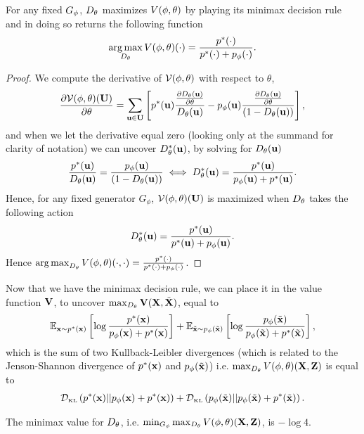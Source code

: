 \begin{theorem}
 \label{theorem:minimax}
 For any fixed $G_\phi$, $D_\theta$ maximizes $V(\phi, \theta)$ by playing its minimax
 decision rule and in doing so returns the following function
  \begin{align}
    \operatorname*{arg\,max}_{D_\theta}V(\phi, \theta)(\cdot) = {p^*(\mathbf{\cdot}) \over p^*(\mathbf{\cdot}) + p_{\phi}(\mathbf{\cdot})}.
  \end{align}
\end{theorem}

\begin{proof}
  We compute the derivative of $\mathcal{V}(\phi, \theta)$ with respect to $\theta$,
  \begin{align}
    \label{eq:derivatives}
    {\partial \Va(\*U) \over \partial \theta} = \sum_{\*u \in \*U}\left[ \ptu { {\partial \D(\*u) \over \partial \theta} \over \D(\*u)} -
    \pgu {{\partial \D(\*u) \over \partial \theta} \over (1 - \D(\*u))}\right],
  \end{align}
  and when we let the derivative equal zero (looking only at the summand for
  clarity of notation) we can uncover $D_\theta^*(\mathbf{u})$, by solving for $D_\theta(\mathbf{u})$
  \begin{align}
    \label{eq:20}
    {\ptu \over \D(\*u)} = {\pgu \over (1 - \D(\*u))} \iff \D^*(\*u) = {\ptu \over \pgu + \ptu}.
  \end{align}
  Hence, for any fixed generator $G_\phi$, $\mathcal{V}(\phi, \theta)(\mathbf{U})$ is maximized when $D_\theta$ takes
  the following action
  \begin{align}
    \label{eq:13}
    \D^*(\*u) = \Dstar{u}.
  \end{align}
  Hence $\operatorname*{arg\,max}_{D_\theta}V(\phi, \theta)(\cdot, \cdot) = {p^*(\mathbf{\cdot}) \over p^*(\mathbf{\cdot}) + p_{\phi}(\mathbf{\cdot})}$.
\end{proof}

Now that we have the minimax decision rule, we can place it in the
value function $\mathbf{V}$, to uncover $\max_{D_\theta}\mathbf{V}(\mathbf{X}, \tilde{\mathbf{X}})$,
equal to
\begin{align}
  \label{eq:sum-of-two-kl-divergences}
   \mathbb{E}_{\*x \sim \pt}\left[\log{{\pt \over p_{\phi}(\*x)+ \pt}}\right] + \mathbb{E}_{\tilde{\*x} \sim \pg}\left[\log{\pg \over \pg + p^*(\tilde{\*x})} \right],
\end{align}
which is the sum of two Kullback-Leibler divergences (which is related
to the Jenson-Shannon divergence of $p^*(\mathbf{x})$ and $p_{\phi}(\tilde{\mathbf{x}})$)
i.e. $\max_{D_\theta}V(\phi, \theta)(\mathbf{X}, \mathbf{Z})$ is equal to
\begin{align}
  \label{eq:16}
  \KL{\pt}{p_{\phi}(\*x) + \pt} + \KL{\pg}{\pg + p^*(\tilde{\*x})}.
\end{align}
\begin{lemma}
  The minimax value for $D_\theta$, i.e. $\min_{G_\phi}\max_{D_\theta}V(\phi, \theta)(\mathbf{X}, \mathbf{Z})$, is $ -
  \log{4}$.
\end{lemma}

